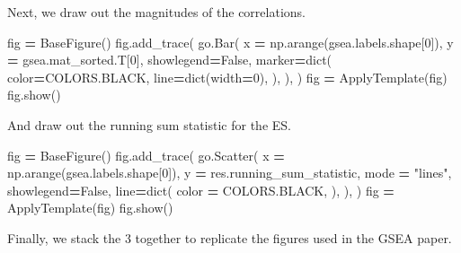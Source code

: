 \documentclass[
]{book}
\newenvironment{Shaded}{\begin{snugshade}}{\end{snugshade}}
\newcommand{\BuiltInTok}[1]{#1}
\newcommand{\DecValTok}[1]{\textcolor[rgb]{0.00,0.00,0.81}{#1}}
\newcommand{\NormalTok}[1]{#1}
\newcommand{\OperatorTok}[1]{\textcolor[rgb]{0.81,0.36,0.00}{\textbf{#1}}}
\newcommand{\StringTok}[1]{\textcolor[rgb]{0.31,0.60,0.02}{#1}}
\newcommand{\VariableTok}[1]{\textcolor[rgb]{0.00,0.00,0.00}{#1}}
\begin{document}
Next, we draw out the magnitudes of the correlations.

\begin{Shaded}
\begin{Highlighting}[numbers=left,,]
\NormalTok{fig }\OperatorTok{=}\NormalTok{ BaseFigure()}
\NormalTok{fig.add\_trace(}
\NormalTok{    go.Bar(}
\NormalTok{        x }\OperatorTok{=}\NormalTok{ np.arange(gsea.labels.shape[}\DecValTok{0}\NormalTok{]),}
\NormalTok{        y }\OperatorTok{=}\NormalTok{ gsea.mat\_sorted.T[}\DecValTok{0}\NormalTok{],}
\NormalTok{        showlegend}\OperatorTok{=}\VariableTok{False}\NormalTok{,}
\NormalTok{        marker}\OperatorTok{=}\BuiltInTok{dict}\NormalTok{(}
\NormalTok{            color}\OperatorTok{=}\NormalTok{COLORS.BLACK,}
\NormalTok{            line}\OperatorTok{=}\BuiltInTok{dict}\NormalTok{(width}\OperatorTok{=}\DecValTok{0}\NormalTok{),}
\NormalTok{        ),}
\NormalTok{    ),}
\NormalTok{)}
\NormalTok{fig }\OperatorTok{=}\NormalTok{ ApplyTemplate(fig)}
\NormalTok{fig.show()}
\end{Highlighting}
\end{Shaded}

And draw out the running sum statistic for the ES.

\begin{Shaded}
\begin{Highlighting}[numbers=left,,]
\NormalTok{fig }\OperatorTok{=}\NormalTok{ BaseFigure()}
\NormalTok{fig.add\_trace(}
\NormalTok{    go.Scatter(}
\NormalTok{        x }\OperatorTok{=}\NormalTok{ np.arange(gsea.labels.shape[}\DecValTok{0}\NormalTok{]),}
\NormalTok{        y }\OperatorTok{=}\NormalTok{ res.running\_sum\_statistic,}
\NormalTok{        mode }\OperatorTok{=} \StringTok{"lines"}\NormalTok{,}
\NormalTok{        showlegend}\OperatorTok{=}\VariableTok{False}\NormalTok{,}
\NormalTok{        line}\OperatorTok{=}\BuiltInTok{dict}\NormalTok{(}
\NormalTok{            color }\OperatorTok{=}\NormalTok{ COLORS.BLACK,}
\NormalTok{        ),}
\NormalTok{    ),}
\NormalTok{)}
\NormalTok{fig }\OperatorTok{=}\NormalTok{ ApplyTemplate(fig)}
\NormalTok{fig.show()}
\end{Highlighting}
\end{Shaded}

Finally, we stack the 3 together to replicate the figures used in the GSEA paper.
\end{document}
